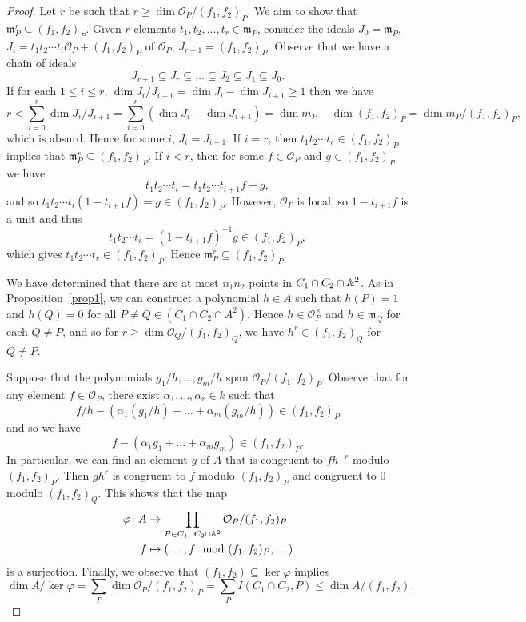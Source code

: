 \documentclass[10pt]{amsart}
\begin{document}
\begin{prop}
\begin{proof}
    Let $r$ be such that $r \geq \dim{\mathcal{O}_P/(f_1, f_2)_P}$.
    We aim to show that $\mathfrak{m}_P^r \subseteq (f_1, f_2)_P$.
    Given $r$ elements $t_1, t_2, \ldots, t_r \in \mathfrak{m}_P$, consider the ideals $J_0 = \mathfrak{m}_P$, $J_i = t_1t_2 \cdots t_i\mathcal{O}_P + (f_1, f_2)_P$ of $\mathcal{O}_P$, $J_{r + 1} = (f_1, f_2)_P.$
    Observe that we have a chain of ideals
    $$J_{r+1} \subseteq J_{r} \subseteq \ldots \subseteq J_2 \subseteq J_1 \subseteq J_0.$$
    If for each $1 \leq i \leq r$, $\dim{J_i/J_{i+1}} = \dim{J_i} - \dim{J_{i+1}} \geq 1$ then we have
    $$r < \sum_{i = 0}^r \dim{J_i/J_{i+1}}= \sum_{i = 0}^r \left(\dim{J_i} - \dim{J_{i+1}}\right) = \dim{m_P} - \dim{(f_1, f_2)_P} = \dim{m_P/(f_1, f_2)_P},$$
    which is absurd.
    Hence for some $i$, $J_i = J_{i+1}$.
    If $i = r$, then $t_1t_2 \cdots t_r \in (f_1, f_2)_P$ implies that $\mathfrak{m}_P^r \subseteq (f_1, f_2)_P$.
    If $i < r$, then for some $f \in \mathcal{O}_P$ and $g \in (f_1, f_2)_P$ we have
    $$t_1 t_2 \cdots t_i = t_1 t_2 \cdots t_{i+1}f + g,$$
    and so $t_1 t_2 \cdots t_i(1 - t_{i+1}f) = g \in (f_1, f_2)_P$.
    However, $\mathcal{O}_P$ is local, so $1 - t_{i+1}f$ is a unit and thus
    $$t_1 t_2 \cdots t_i = (1 - t_{i+1}f)^{-1}g \in (f_1, f_2)_P,$$
    which gives $t_1 t_2 \cdots t_r \in (f_1, f_2)_P$.
    Hence $\mathfrak{m}_P^r \subseteq (f_1, f_2)_P$.

    We have determined that there are at most $n_1n_2$ points in $C_1 \cap C_2 \cap \mathbb{A}^2$.
    As in Proposition~\ref{prop1}, we can construct a polynomial $h \in A$ such that $h(P) = 1$ and $h(Q) = 0$ for all $P \neq Q \in (C_1 \cap C_2 \cap A^2)$.
    Hence $h \in \mathcal{O}_P^\times$ and $h \in \mathfrak{m}_Q$ for each $Q \neq P$, and so for $r \geq \dim{\mathcal{O}_Q / (f_1, f_2)_Q}$, we have $h^r \in (f_1, f_2)_Q$ for $Q \neq P$.

    Suppose that the polynomials $g_1/h, \ldots, g_m/h$ span $\mathcal{O}_P/(f_1, f_2)_P$.
    Observe that for any element $f \in \mathcal{O}_P$, there exist $\alpha_1, \ldots, \alpha_r \in k$ such that
    $$f/h - (\alpha_1(g_1/h) + \ldots + \alpha_m(g_m/h)) \in (f_1, f_2)_P$$
    and so we have
    $$f - (\alpha_1g_1 + \ldots + \alpha_mg_m) \in (f_1, f_2)_P.$$
    In particular, we can find an element $g$ of $A$ that is congruent to $f  h^{-r}$ modulo $(f_1, f_2)_P$.
    Then $gh^r$ is congruent to $f$ modulo $(f_1, f_2)_P$ and congruent to 0 modulo $(f_1, f_2)_Q$.
    This shows that the map
    \begin{align*}
      \varphi \colon A &\rightarrow \prod_{P \in C_1 \cap C_2 \cap \mathbb{A}^2} \mathcal{O}_P/(f_1, f_2)_P\\
      f &\mapsto (\ldots, f \mod{ (f_1, f_2)_P}, \ldots)
    \end{align*}
    is a surjection.
    Finally, we observe that $(f_1, f_2) \subseteq \ker\varphi$ implies
    $$\dim{A/\ker\varphi} = \sum_{P} \dim{\mathcal{O}_P/(f_1, f_2)_P} = \sum_{P} I(C_1 \cap C_2, P) \leq \dim{A/(f_1, f_2)}.$$	
  \end{proof}
\end{prop}
\end{document}
